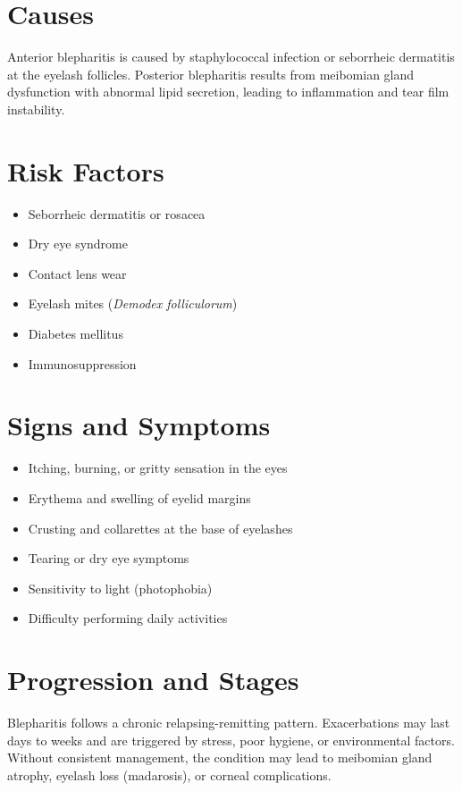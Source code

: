 \section{Causes}
Anterior blepharitis is caused by staphylococcal infection or seborrheic dermatitis at the eyelash follicles. Posterior blepharitis results from meibomian gland dysfunction with abnormal lipid secretion, leading to inflammation and tear film instability.

\section{Risk Factors}
\begin{itemize}[noitemsep]
  \item Seborrheic dermatitis or rosacea
  \item Dry eye syndrome
  \item Contact lens wear
  \item Eyelash mites (\emph{Demodex folliculorum})
  \item Diabetes mellitus
  \item Immunosuppression
\end{itemize}

\section{Signs and Symptoms}
\begin{itemize}[noitemsep]
  \item Itching, burning, or gritty sensation in the eyes
  \item Erythema and swelling of eyelid margins
  \item Crusting and collarettes at the base of eyelashes
  \item Tearing or dry eye symptoms
  \item Sensitivity to light (photophobia)
  \item Difficulty performing daily activities
\end{itemize}

\section{Progression and Stages}
Blepharitis follows a chronic relapsing-remitting pattern. Exacerbations may last days to weeks and are triggered by stress, poor hygiene, or environmental factors. Without consistent management, the condition may lead to meibomian gland atrophy, eyelash loss (madarosis), or corneal complications.

